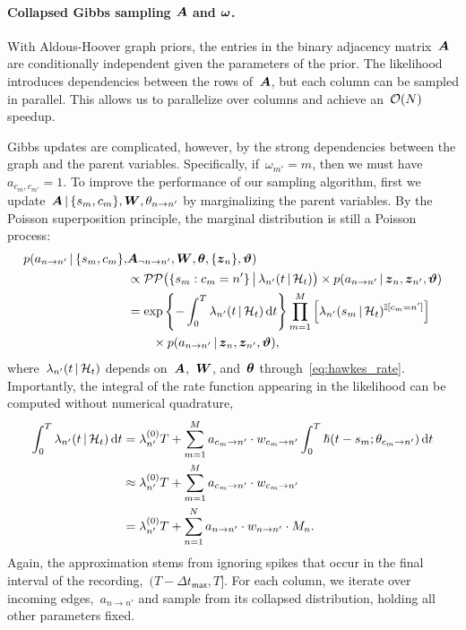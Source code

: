 \paragraph{Collapsed Gibbs sampling $\boldsymbol{A}$ and $\boldsymbol{\omega}$.}
With Aldous-Hoover graph priors, the entries in the binary adjacency
matrix~$\boldsymbol{A}$ are conditionally independent given the parameters of the
prior. The likelihood introduces dependencies between the rows
of~$\boldsymbol{A}$, but each column can be sampled in parallel.
This
allows us to parallelize over columns and achieve an~$\mathcal{O}(N)$
speedup.

Gibbs updates
are complicated, however, by the strong dependencies between the graph and the
parent variables. Specifically, if~${\omega_{m'}=m}$, then
we must have~${a_{c_{m},c_{m'}}=1}$. To improve the performance of our
sampling algorithm, first we
update~${\boldsymbol{A}\,|\,\{s_m,c_m\},\boldsymbol{W},\theta_{n \to n'}}$ by marginalizing
the parent variables. By the Poisson superposition principle, the marginal
distribution is still a Poisson process:
\begin{align*}
  p(a_{n \to n'} \,|\, \{s_m, c_m\}, &\boldsymbol{A}_{\neg n \to n'}, \boldsymbol{W}, \boldsymbol{\theta}, \{\boldsymbol{z}_n\}, \boldsymbol{\vartheta}) 
  \\
  &\propto \mathcal{PP} \big(\{s_m: c_m=n'\} \, \big| \, \lambda_{n'}(t \,|\, \mathcal{H}_t)\big)
  \times p(a_{n \to n'} \,|\, \boldsymbol{z}_n, \boldsymbol{z}_{n'}, \boldsymbol{\vartheta}) \\
  &= \exp \left \{ -\int_0^T \lambda_{n'}(t \,|\, \mathcal{H}_t) \, \mathrm{d}t \right\}
  \prod_{m=1}^M \left[ \lambda_{n'}(s_m \,|\, \mathcal{H}_t)^{\mathbb{I}[c_m=n']} \right]\\
  &\qquad \times p(a_{n \to n'}  \,|\, \boldsymbol{z}_n, \boldsymbol{z}_{n'}, \boldsymbol{\vartheta}),
\end{align*}
where~$\lambda_{n'}(t \,|\, \mathcal{H}_t)$ depends on~$\boldsymbol{A}$,~$\boldsymbol{W}$, and~$\boldsymbol{\theta}$
through~\eqref{eq:hawkes_rate}.
Importantly, the integral of the rate function appearing in the
likelihood can be computed without numerical quadrature,
\begin{align*}
  \int_0^T \lambda_{n'}(t \,|\, \mathcal{H}_t) \, \mathrm{d}t
  &= \lambda^{(0)}_{n'} T +
  \sum_{m=1}^M a_{c_m \to n'} \cdot w_{c_m \to n'}
  \int_0^T  \hbar(t-s_m; \theta_{c_m \to n'}) \, \mathrm{d}t \\
  &\approx \lambda^{(0)}_{n'} T + \sum_{m=1}^M a_{c_m \to n'} \cdot w_{c_m \to n'} \\
  &= \lambda^{(0)}_{n'} T + \sum_{n=1}^N a_{n \to n'} \cdot w_{n \to n'} \cdot M_{n}.
\end{align*}
Again, the approximation stems from ignoring spikes that occur in the
final interval of the recording,~${(T-\Delta t_{\mathsf{max}}, T]}$.
  For each column, we iterate over incoming edges,~$a_{n \to n'}$ and
  sample from its collapsed distribution, holding all other parameters
  fixed.

